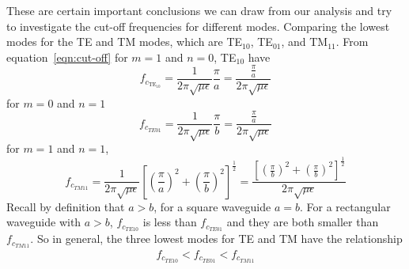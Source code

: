 These are certain important conclusions we can draw from our analysis and try to investigate the cut-off frequencies for different modes. Comparing the lowest modes for the TE and TM modes, which are TE$_{10}$, TE$_{01}$, and TM$_{11}$.
From equation~\ref{eqn:cut-off} for  $m=1$ and $n=0$, TE$_{10}$ have 
\begin{dmath*}
f_{c_{\text{TE}_{10}}} = \frac{1}{2\pi \sqrt{\mu\epsilon}}\frac{\pi}{a} = \frac{\frac{\pi}{a}}{2\pi \sqrt{\mu\epsilon}}
\end{dmath*}
for $m=0$ and $n=1$
\begin{dmath*}
f_{c_{TE{01}}} = \frac{1}{2\pi \sqrt{\mu\epsilon}}\frac{\pi}{b} = \frac{\frac{\pi}{a}}{2\pi \sqrt{\mu\epsilon}}
\end{dmath*}
for $m=1$ and $n=1$, 
\begin{dmath*} 
f_{c_{TM{11}}} = \frac{1}{2\pi \sqrt{\mu\epsilon}}\left[\left(\frac{\pi}{a}\right)^2 + \left(\dfrac{\pi}{b}\right)^2\right]^{\frac{1}{2}} = \frac{\left[\left(\frac{\pi}{b}\right)^2 + \left(\frac{\pi}{b}\right)^2\right]^{\frac{1}{2}}}{2\pi \sqrt{\mu\epsilon}}
\end{dmath*}
Recall by definition that $a>b$, for a square waveguide $a=b$. For a rectangular waveguide with $a>b$, $f_{c_{TE{10}}}$ is less than $f_{c_{TE{01}}}$ and they are both smaller than $f_{c_{TM{11}}}$. So in general, the three lowest modes for TE and TM have the relationship 
\begin{align*}
f_{c_{TE{10}}}<f_{c_{TE{01}}}<f_{c_{TM{11}}}
\end{align*}
